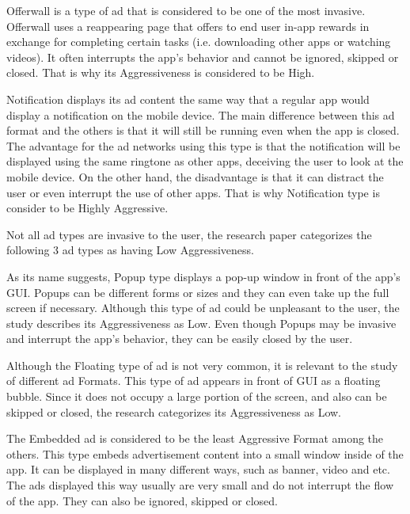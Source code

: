 \documentclass[conference]{IEEEtran}
\begin{document}
Offerwall is a type of ad that is considered to be one of the most invasive. Offerwall uses a reappearing page that offers to end user in-app rewards in exchange for completing certain tasks (i.e. downloading other apps or watching videos). It often interrupts the app’s behavior and cannot be ignored, skipped or closed. That is why its Aggressiveness is considered to be High. 

Notification displays its ad content the same way that a regular app would display a notification on the mobile device. The main difference between this ad format and the others is that it will still be running even when the app is closed. The advantage for the ad networks using this type is that the notification will be displayed using the same ringtone as other apps, deceiving the user to look at the mobile device. On the other hand, the disadvantage is that it can distract the user or even interrupt the use of other apps. That is why Notification type is consider to be Highly Aggressive.

Not all ad types are invasive to the user, the research paper categorizes the following 3 ad types as having Low Aggressiveness.

As its name suggests, Popup type displays a pop-up window in front of the app’s GUI. Popups can be different forms or sizes and they can even take up the full screen if necessary. Although this type of ad could be unpleasant to the user, the study describes its Aggressiveness as Low. Even though Popups may be invasive and interrupt the app’s behavior, they can be easily closed by the user. 

Although the Floating type of ad is not very common, it is relevant to the study of different ad Formats. This type of ad appears in front of GUI as a floating bubble. Since it does not occupy a large portion of the screen, and also can be skipped or closed, the research categorizes its Aggressiveness as Low. 

The Embedded ad is considered to be the least Aggressive Format among the others. This type embeds advertisement content into a small window inside of the app. It can be displayed in many different ways, such as banner, video and etc. The ads displayed this way usually are very small and do not interrupt the flow of the app. They can also be ignored, skipped or closed.
\end{document}
